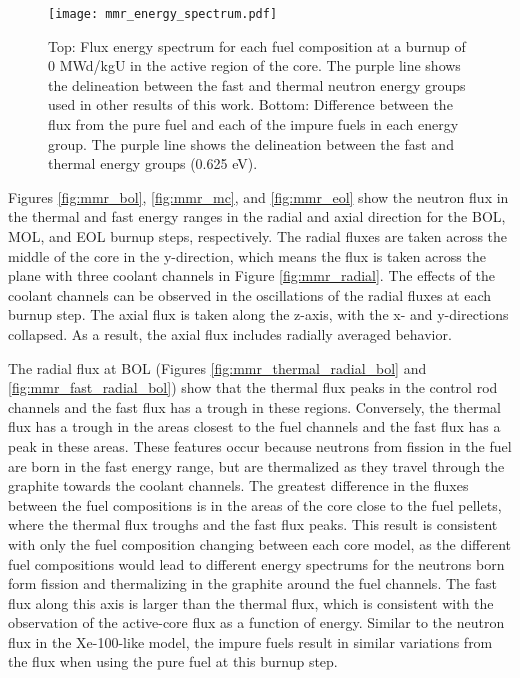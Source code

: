 \begin{figure}
        \centering
        \texttt{[image: mmr\_energy\_spectrum.pdf]}
        \caption{Top: Flux energy spectrum for each fuel composition at a 
        burnup of 0 MWd/kgU in the active region of the core. The 
        purple line shows the delineation between the fast and thermal 
        neutron energy groups used in other results of this work.
        Bottom: Difference between the flux from the pure fuel and each 
        of the impure fuels in each energy group. The purple line shows the 
        delineation between the fast and thermal energy groups (0.625 eV). }
        \label{fig:mmr_energy_spectrum}
\end{figure}

Figures \ref{fig:mmr_bol}, \ref{fig:mmr_mc}, and \ref{fig:mmr_eol} show 
the neutron flux in the thermal and fast energy ranges in the radial and axial 
direction for the \gls{BOL}, \gls{MOL}, and \gls{EOL} burnup steps, 
respectively. The radial fluxes are taken 
across the middle of the core in the y-direction, which means the flux 
is taken across the plane with three coolant channels in Figure 
\ref{fig:mmr_radial}. The effects of the coolant channels can be observed 
in the oscillations of the radial fluxes at each burnup step. The axial 
flux is taken along the z-axis, with the 
x- and y-directions collapsed. As a result, the axial flux includes 
radially averaged behavior. 

The radial flux at \gls{BOL} (Figures \ref{fig:mmr_thermal_radial_bol} and 
\ref{fig:mmr_fast_radial_bol}) show that the thermal flux peaks in the 
control rod channels and the fast flux has a trough in these regions. 
Conversely, the thermal flux has a trough in the areas closest to the fuel 
channels and the fast flux has a peak in these areas. These features occur 
because neutrons from fission in the fuel are born in the fast energy 
range, but are thermalized as they travel through the graphite towards 
the coolant channels. 
The greatest difference in the 
fluxes between the fuel compositions is in the areas of the core close 
to the fuel pellets, where the thermal flux troughs and the fast flux 
peaks. This result is consistent with only the fuel 
composition changing between each core model, as the different fuel 
compositions would lead to different energy spectrums for the neutrons 
born form fission and thermalizing in the graphite around the fuel channels.
The fast flux along this axis is larger than the thermal flux, which is 
consistent with the observation of the active-core flux as a function of 
energy. Similar to the neutron flux in the Xe-100-like model, the 
impure fuels result in similar variations from the flux when 
using the pure fuel at this burnup step.

